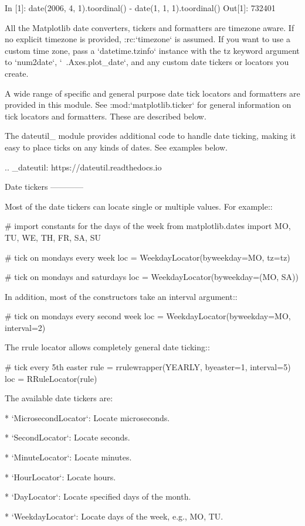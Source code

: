 \begin{DoxyVerb}
     In [1]: date(2006, 4, 1).toordinal() - date(1, 1, 1).toordinal()
     Out[1]: 732401

All the Matplotlib date converters, tickers and formatters are timezone aware.
If no explicit timezone is provided, :rc:`timezone` is assumed.  If you want to
use a custom time zone, pass a `datetime.tzinfo` instance with the tz keyword
argument to `num2date`, `~.Axes.plot_date`, and any custom date tickers or
locators you create.

A wide range of specific and general purpose date tick locators and
formatters are provided in this module.  See
:mod:`matplotlib.ticker` for general information on tick locators
and formatters.  These are described below.

The dateutil_ module provides additional code to handle date ticking, making it
easy to place ticks on any kinds of dates.  See examples below.

.. _dateutil: https://dateutil.readthedocs.io

Date tickers
------------

Most of the date tickers can locate single or multiple values.  For example::

    # import constants for the days of the week
    from matplotlib.dates import MO, TU, WE, TH, FR, SA, SU

    # tick on mondays every week
    loc = WeekdayLocator(byweekday=MO, tz=tz)

    # tick on mondays and saturdays
    loc = WeekdayLocator(byweekday=(MO, SA))

In addition, most of the constructors take an interval argument::

    # tick on mondays every second week
    loc = WeekdayLocator(byweekday=MO, interval=2)

The rrule locator allows completely general date ticking::

    # tick every 5th easter
    rule = rrulewrapper(YEARLY, byeaster=1, interval=5)
    loc = RRuleLocator(rule)

The available date tickers are:

* `MicrosecondLocator`: Locate microseconds.

* `SecondLocator`: Locate seconds.

* `MinuteLocator`: Locate minutes.

* `HourLocator`: Locate hours.

* `DayLocator`: Locate specified days of the month.

* `WeekdayLocator`: Locate days of the week, e.g., MO, TU.


\end{DoxyVerb}
